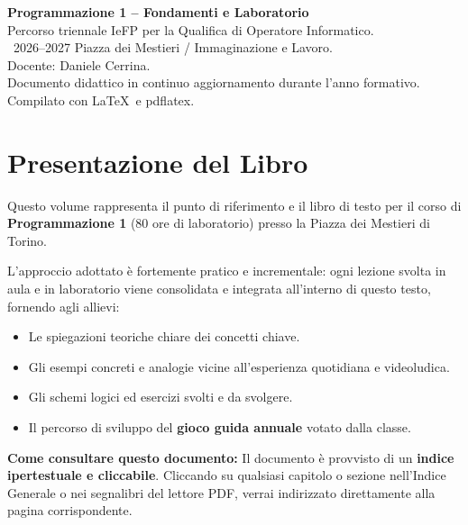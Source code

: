 \documentclass[11pt,a4paper,openany]{book}
\begin{document}
\thispagestyle{empty}
\vspace*{12cm}
\begin{flushleft}
  \small\color{PiazzaGray}
  \textbf{Programmazione 1 -- Fondamenti e Laboratorio}\\
  Percorso triennale IeFP per la Qualifica di Operatore Informatico.\\
  \textcopyright~2026--2027 Piazza dei Mestieri / Immaginazione e Lavoro.\\
  Docente: Daniele Cerrina.\\
  \vspace{0.8em}
  Documento didattico in continuo aggiornamento durante l'anno formativo.\\
  Compilato con \LaTeX\ e \textsf{pdflatex}.
\end{flushleft}

\clearpage

\chapter*{Presentazione del Libro}

Questo volume rappresenta il punto di riferimento e il libro di testo per il corso di \textbf{Programmazione 1} (80 ore di laboratorio) presso la Piazza dei Mestieri di Torino.

L'approccio adottato è fortemente pratico e incrementale: ogni lezione svolta in aula e in laboratorio viene consolidata e integrata all'interno di questo testo, fornendo agli allievi:
\begin{itemize}
  \item Le spiegazioni teoriche chiare dei concetti chiave.
  \item Gli esempi concreti e analogie vicine all'esperienza quotidiana e videoludica.
  \item Gli schemi logici ed esercizi svolti e da svolgere.
  \item Il percorso di sviluppo del \textbf{gioco guida annuale} votato dalla classe.
\end{itemize}

\vspace{1em}
\noindent\textbf{Come consultare questo documento:}
Il documento è provvisto di un \textbf{indice ipertestuale e cliccabile}. Cliccando su qualsiasi capitolo o sezione nell'Indice Generale o nei segnalibri del lettore PDF, verrai indirizzato direttamente alla pagina corrispondente.
\end{document}
